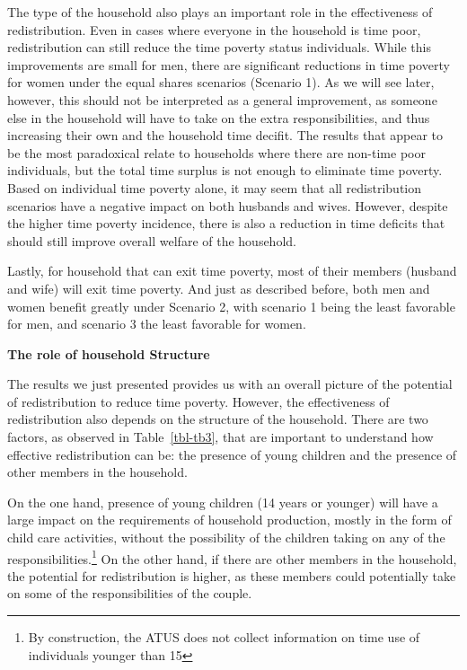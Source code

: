 \documentclass[
  11pt,
]{article}
\begin{document}
The type of the household also plays an important role in the
effectiveness of redistribution. Even in cases where everyone in the
household is time poor, redistribution can still reduce the time poverty
status individuals. While this improvements are small for men, there are
significant reductions in time poverty for women under the equal shares
scenarios (Scenario 1). As we will see later, however, this should not
be interpreted as a general improvement, as someone else in the
household will have to take on the extra responsibilities, and thus
increasing their own and the household time decifit. The results that
appear to be the most paradoxical relate to households where there are
non-time poor individuals, but the total time surplus is not enough to
eliminate time poverty. Based on individual time poverty alone, it may
seem that all redistribution scenarios have a negative impact on both
husbands and wives. However, despite the higher time poverty incidence,
there is also a reduction in time deficits that should still improve
overall welfare of the household.

Lastly, for household that can exit time poverty, most of their members
(husband and wife) will exit time poverty. And just as described before,
both men and women benefit greatly under Scenario 2, with scenario 1
being the least favorable for men, and scenario 3 the least favorable
for women.

\textbf{The role of household Structure}

The results we just presented provides us with an overall picture of the
potential of redistribution to reduce time poverty. However, the
effectiveness of redistribution also depends on the structure of the
household. There are two factors, as observed in Table~\ref{tbl-tb3},
that are important to understand how effective redistribution can be:
the presence of young children and the presence of other members in the
household.

On the one hand, presence of young children (14 years or younger) will
have a large impact on the requirements of household production, mostly
in the form of child care activities, without the possibility of the
children taking on any of the responsibilities.\footnote{By
  construction, the ATUS does not collect information on time use of
  individuals younger than 15} On the other hand, if there are other
members in the household, the potential for redistribution is higher, as
these members could potentially take on some of the responsibilities of
the couple.
\end{document}
